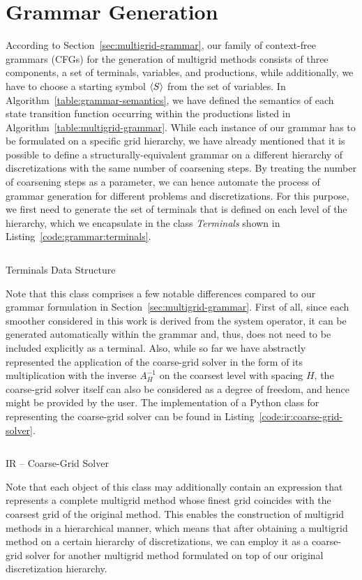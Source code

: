 \section{Grammar Generation}
According to Section~\ref{sec:multigrid-grammar}, our family of context-free grammars (CFGs) for the generation of multigrid methods consists of three components, a set of terminals, variables, and productions, while additionally, we have to choose a starting symbol $\langle S \rangle$ from the set of variables.
In Algorithm~\ref{table:grammar-semantics}, we have defined the semantics of each state transition function occurring within the productions listed in Algorithm~\ref{table:multigrid-grammar}.
While each instance of our grammar has to be formulated on a specific grid hierarchy, we have already mentioned that it is possible to define a structurally-equivalent grammar on a different hierarchy of discretizations with the same number of coarsening steps.
By treating the number of coarsening steps as a parameter, we can hence automate the process of grammar generation for different problems and discretizations.
For this purpose, we first need to generate the set of terminals that is defined on each level of the hierarchy, which we encapsulate in the class \emph{Terminals} shown in Listing~\ref{code:grammar:terminals}.
\begin{listing}
	\inputminted{python}{evostencils/grammar/terminals.py}
	\caption{Terminals Data Structure}
	\label{code:grammar:terminals}
\end{listing}
Note that this class comprises a few notable differences compared to our grammar formulation in Section~\ref{sec:multigrid-grammar}.
First of all, since each smoother considered in this work is derived from the system operator, it can be generated automatically within the grammar and, thus, does not need to be included explicitly as a terminal.
Also, while so far we have abstractly represented the application of the coarse-grid solver in the form of its multiplication with the inverse $A^{-1}_H$ on the coarsest level with spacing $H$, the coarse-grid solver itself can also be considered as a degree of freedom, and hence might be provided by the user.
The implementation of a Python class for representing the coarse-grid solver can be found in Listing~\ref{code:ir:coarse-grid-solver}.
\begin{listing}
	\inputminted{python}{evostencils/ir/coarse_grid_solver.py}
	\caption{IR -- Coarse-Grid Solver}
	\label{code:ir:coarse-grid-solver}
\end{listing}
Note that each object of this class may additionally contain an expression that represents a complete multigrid method whose finest grid coincides with the coarsest grid of the original method.
This enables the construction of multigrid methods in a hierarchical manner, which means that after obtaining a multigrid method on a certain hierarchy of discretizations, we can employ it as a coarse-grid solver for another multigrid method formulated on top of our original discretization hierarchy.

